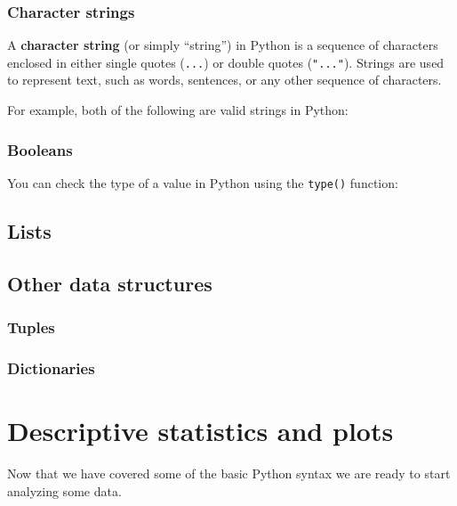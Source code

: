 \documentclass[
  letterpaper,
  DIV=11,
  numbers=noendperiod]{scrreprt}
\begin{document}
\subsection{Character strings}\label{character-strings}

A \textbf{character string} (or simply ``string'') in Python is a
sequence of characters enclosed in either single quotes
(\texttt{\textquotesingle{}...\textquotesingle{}}) or double quotes
(\texttt{"..."}). Strings are used to represent text, such as words,
sentences, or any other sequence of characters.

For example, both of the following are valid strings in Python:

\subsection{Booleans}\label{booleans}

You can check the type of a value in Python using the \texttt{type()}
function:

\section{Lists}\label{lists}

\section{Other data structures}\label{other-data-structures}

\subsection{Tuples}\label{tuples}

\subsection{Dictionaries}\label{dictionaries}


\chapter{Descriptive statistics and
plots}\label{descriptive-statistics-and-plots}

Now that we have covered some of the basic Python syntax we are ready to
start analyzing some data.

\end{document}
